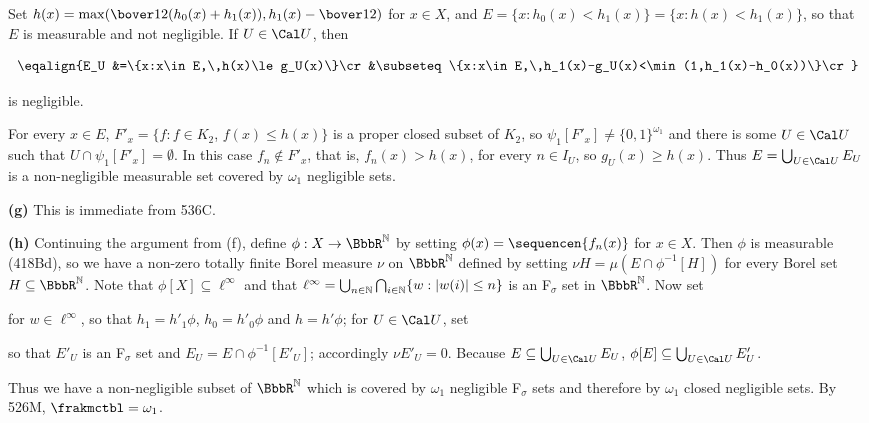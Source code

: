 {Set $h(x)=\max(\bover12(h_0(x)+h_1(x)),h_1(x)-\bover12)$ for $x\in X$,
and $E=\{x:h_0(x)<h_1(x)\}=\{x:h(x)<h_1(x)\}$, so that $E$ is measurable
and not negligible.   If  $U\in\Cal U$, then

$$\eqalign{E_U
&=\{x:x\in E,\,h(x)\le g_U(x)\}\cr
&\subseteq\{x:x\in E,\,h_1(x)-g_U(x)<\min(1,h_1(x)-h_0(x))\}\cr}$$

\noindent is negligible.

For every $x\in E$,
$F'_x=\{f:f\in K_2$, $f(x)\le h(x)\}$ is a proper closed subset of
$K_2$, so $\psi_1[F'_x]\ne\{0,1\}^{\omega_1}$ and there is some
$U\in\Cal U$ such that $U\cap\psi_1[F'_x]=\emptyset$.   In this case
$f_n\notin F'_x$, that is, $f_n(x)>h(x)$, for every $n\in I_U$, so
$g_U(x)\ge h(x)$.   Thus $E=\bigcup_{U\in\Cal U}E_U$ is a non-negligible
measurable set covered by $\omega_1$ negligible sets.

\medskip

{\bf (g)} This is immediate from 536C.

\medskip

{\bf (h)} Continuing the argument from (f), define
$\phi:X\to\BbbR^{\Bbb N}$ by setting $\phi(x)=\sequencen{f_n(x)}$ for
$x\in X$.   Then $\phi$ is measurable (418Bd), so we have a non-zero
totally finite Borel measure $\nu$ on $\BbbR^{\Bbb N}$ defined by
setting $\nu H=\mu(E\cap\phi^{-1}[H])$ for every Borel set
$H\subseteq\BbbR^{\Bbb N}$.   Note that $\phi[X]\subseteq\ell^{\infty}$
and that $\ell^{\infty}
=\bigcup_{n\in\Bbb N}\bigcap_{i\in\Bbb N}\{w:|w(i)|\le n\}$ is an
F$_{\sigma}$ set in $\BbbR^{\Bbb N}$.   Now set



\noindent for $w\in\ell^{\infty}$, so that $h_1=h'_1\phi$,
$h_0=h'_0\phi$ and $h=h'\phi$;  for $U\in\Cal U$, set


\noindent so that $E'_U$ is an F$_{\sigma}$ set and
$E_U=E\cap\phi^{-1}[E'_U]$;  accordingly $\nu E'_U=0$.   Because
$E\subseteq\bigcup_{U\in\Cal U}E_U$,
$\phi[E]\subseteq\bigcup_{U\in\Cal U}E'_U$.

Thus we have a non-negligible subset of $\BbbR^{\Bbb N}$ which is
covered by $\omega_1$ negligible F$_{\sigma}$ sets and therefore by
$\omega_1$ closed negligible sets.   By 526M, $\frakmctbl=\omega_1$.
}%

